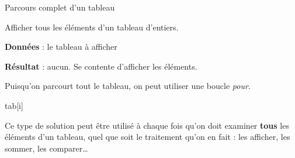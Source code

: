 \begin{Fiche}{Parcours complet d'un tableau}
\label{fiche:tab-parcours-complet}

	Afficher tous les éléments d'un tableau d'entiers.

	
	\textbf{Données} : le tableau à afficher
		
	\textbf{Résultat} : aucun. Se contente d'afficher les éléments.


	Puisqu'on parcourt tout le tableau,
	on peut utiliser une boucle \emph{pour}.
	
	\begin{LDA}
				\Write tab[i]
			\EndFor
		\EndAlgo
	\end{LDA}


	Ce type de solution peut être utilisé à chaque fois
	qu'on doit examiner \textbf{tous} les éléments d'un tableau,
	quel que soit le traitement qu'on en fait :
	les afficher, les sommer, les comparer\dots
	
	
\end{Fiche}
